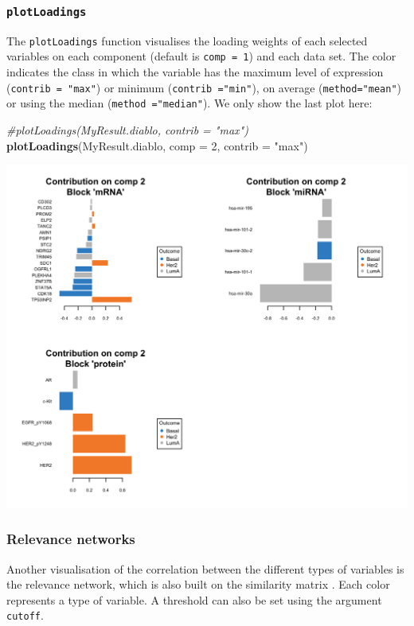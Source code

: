 \documentclass[]{book}
\newenvironment{Shaded}{\begin{snugshade}}{\end{snugshade}}
\newcommand{\KeywordTok}[1]{\textcolor[rgb]{0.13,0.29,0.53}{\textbf{#1}}}
\newcommand{\DataTypeTok}[1]{\textcolor[rgb]{0.13,0.29,0.53}{#1}}
\newcommand{\DecValTok}[1]{\textcolor[rgb]{0.00,0.00,0.81}{#1}}
\newcommand{\StringTok}[1]{\textcolor[rgb]{0.31,0.60,0.02}{#1}}
\newcommand{\CommentTok}[1]{\textcolor[rgb]{0.56,0.35,0.01}{\textit{#1}}}
\newcommand{\NormalTok}[1]{#1}
\theoremstyle{definition}
\theoremstyle{definition}
\theoremstyle{definition}
\theoremstyle{remark}
\begin{document}
\subsubsection{\texorpdfstring{\texttt{plotLoadings}}{plotLoadings}}\label{plotloadings}

The \texttt{plotLoadings} function visualises the loading weights of
each selected variables on each component (default is
\texttt{comp\ =\ 1}) and each data set. The color indicates the class in
which the variable has the maximum level of expression
(\texttt{contrib\ =\ "max"}) or minimum (\texttt{contrib\ ="min"}), on
average (\texttt{method="mean"}) or using the median
(\texttt{method\ ="median"}). We only show the last plot here:

\begin{Shaded}
\begin{Highlighting}[]
\CommentTok{#plotLoadings(MyResult.diablo, contrib = "max")}
\KeywordTok{plotLoadings}\NormalTok{(MyResult.diablo, }\DataTypeTok{comp =} \DecValTok{2}\NormalTok{, }\DataTypeTok{contrib =} \StringTok{"max"}\NormalTok{)}
\end{Highlighting}
\end{Shaded}

\begin{center}\includegraphics[width=0.5\linewidth]{Figures/unnamed-chunk-9-1} \end{center}

\subsubsection{Relevance networks}\label{relevance-networks}

Another visualisation of the correlation between the different types of
variables is the relevance network, which is also built on the
similarity matrix \citep{Gon12}. Each color represents a type of
variable. A threshold can also be set using the argument
\texttt{cutoff}.
\end{document}
